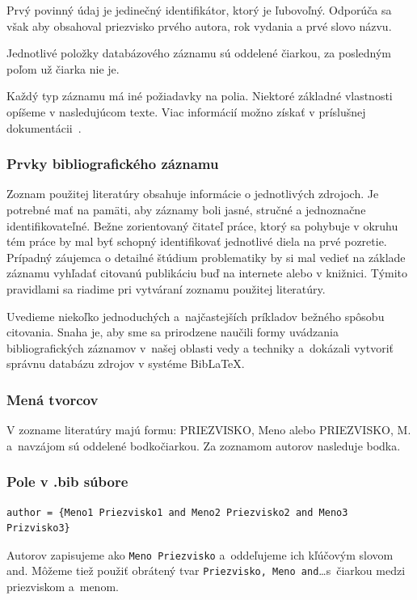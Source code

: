 \documentclass[../../../thesis.tex]{subfiles}
\begin{document}
Prvý povinný údaj je jedinečný identifikátor, ktorý je ľubovoľný.
Odporúča sa však aby obsahoval priezvisko prvého autora, rok vydania a prvé slovo názvu.

Jednotlivé položky databázového záznamu sú oddelené čiarkou,
za posledným poľom už čiarka nie je.

Každý typ záznamu má iné požiadavky na polia.
Niektoré základné vlastnosti opíšeme v nasledujúcom texte.
Viac informácií možno získať v príslušnej dokumentácii~\cite{Hoftich2022iso690}.

\subsubsection{Prvky bibliografického záznamu}
Zoznam použitej literatúry obsahuje informácie o jednotlivých zdrojoch. Je potrebné mať na pamäti, aby záznamy boli jasné, stručné a jednoznačne identifikovateľné. Bežne zorientovaný čitateľ práce, ktorý sa pohybuje v okruhu tém práce by mal byť schopný identifikovať jednotlivé diela na prvé pozretie. Prípadný záujemca o detailné štúdium problematiky by si mal vedieť na základe záznamu vyhľadať citovanú publikáciu buď na internete alebo v knižnici. Týmito pravidlami sa riadime pri vytváraní zoznamu použitej literatúry.

Uvedieme niekoľko jednoduchých a~najčastejších príkladov bežného
spôsobu citovania.
Snaha je, aby sme sa prirodzene naučili formy uvádzania
bibliografických záznamov v~našej oblasti vedy a techniky
a~dokázali vytvoriť správnu databázu zdrojov v systéme Bib\LaTeX.

\subsubsection*{Mená tvorcov}
V zozname literatúry majú formu: PRIEZVISKO, Meno alebo PRIEZVISKO, M. a~navzájom sú oddelené bodkočiarkou.
Za zoznamom autorov nasleduje bodka.

\subsubsection*{\normalsize Pole v .bib súbore}
\begin{verbatim}
author = {Meno1 Priezvisko1 and Meno2 Priezvisko2 and Meno3 Prizvisko3}
\end{verbatim}
Autorov zapisujeme ako \verb|Meno Priezvisko| a~oddeľujeme ich kľúčovým slovom and.
Môžeme tiež použiť obrátený tvar \verb|Priezvisko, Meno and|\dots s~čiarkou medzi priezviskom a~menom.
\end{document}
